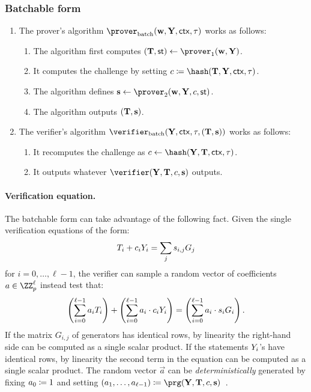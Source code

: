 \documentclass[runningheads,11pt]{article}
\begin{document}
\subsubsection{Batchable form}


\begin{enumerate}
  \item
    The prover's algorithm $\batchprover(\vec \witness, \vec \statement,\ctx, \stag)$ works as follows:
    \begin{enumerate}
      \item
        The algorithm first computes $(\vec \commitment,\st)\gets\prover_1(\vec \witness, \vec \statement)$.
      \item
        It computes the challenge by setting $c\defeq\hash(\vec \commitment, \vec \statement,\ctx, \stag)$.
      \item
        The algorithm defines $\vec \response\gets\prover_2(\vec \witness, \vec \statement,\challenge,\st)$.
      \item
        The algorithm outputs $(\mathbf {T}, \mathbf {s})$.
    \end{enumerate}
  \item
    The verifier's algorithm $\batchverifier(\vec \statement, \ctx, \stag, (\vec \commitment,\vec s))$ works as follows:
    \begin{enumerate}
      \item
        It recomputes the challenge as $c\gets\hash(\vec \statement, \vec \commitment, \ctx, \stag)$.
      \item
        It outputs whatever $\verifier(\vec \statement,\vec \commitment,\challenge,\vec \response)$ outputs.
    \end{enumerate}
\end{enumerate}


\paragraph{Verification equation.}
The batchable form can take advantage of the following fact.
Given the single verification equations of the form:
\[
   T_i + c_i Y_i = \sum_j s_{i, j} G_j
\]
for $i=0, \dots,\ell-1$,
the verifier can sample a random vector of coefficients $a \in \ZZ_p^\ell$ instead test that:
\[
  \left(\sum_{i=0}^{\ell-1} a_i T_i\right) + \left(\sum_{i=0}^{\ell-1} a_i \cdot  c_i Y_i \right) = \left(\sum_{i=0}^{\ell-1} a_i \cdot s_i G_i\right).
\]
If the matrix $G_{i, j}$ of generators has identical rows, by linearity the right-hand side can be computed as a single scalar product.
If the statements $Y_i$'s have identical rows, by linearity the second term in the equation can be computed as a single scalar product.
The random vector $\vec a$ can be \emph{deterministically} generated by fixing $a_0 \coloneqq 1$ and setting $(a_1, \dots, a_{\ell-1}) \defeq \prg(\vec Y, \vec T,  \challenge, \vec s)$~\cite{bip-schnorr}.
\end{document}
